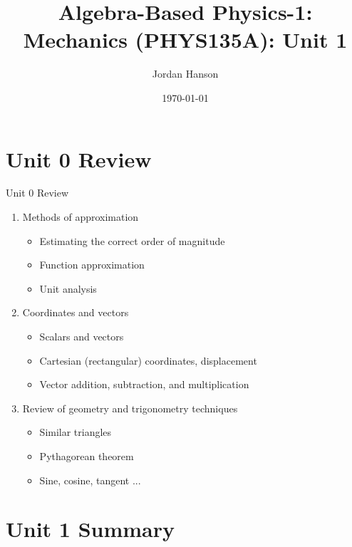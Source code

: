 \documentclass{beamer}
\title{Algebra-Based Physics-1: Mechanics (PHYS135A): Unit 1}
\date{\today}
\author{Jordan Hanson}
\institute{Whittier College Department of Physics and Astronomy}
\begin{document}
\maketitle

\section{Unit 0 Review}

\begin{frame}{Unit 0 Review}
\begin{enumerate}
\item Methods of approximation
\begin{itemize}
\item \alert{Estimating} the correct order of magnitude
\item \alert{Function} approximation
\item \alert{Unit analysis}
\end{itemize}
\item Coordinates and vectors
\begin{itemize}
\item \alert{Scalars} and \alert{vectors}
\item \alert{Cartesian} (rectangular) coordinates, displacement
\item \alert{Vector} addition, subtraction, and multiplication
\end{itemize}
\item Review of geometry and trigonometry techniques
\begin{itemize}
\item Similar triangles
\item Pythagorean theorem
\item Sine, cosine, tangent ...
\end{itemize}
\end{enumerate}
\end{frame}

\section{Unit 1 Summary}
\end{document}

